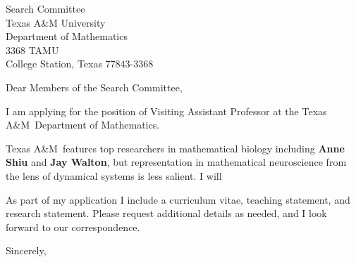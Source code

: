\documentclass[11pt,a4paper]{letter}
\begin{document}

\def\School{Texas A\&M}

\begin{letter}
{Search Committee\\
Texas A\&M University\\
Department of Mathematics\\
3368 TAMU\\
College Station, Texas 77843-3368}


\opening{Dear Members of the Search Committee,}

I am applying for the position of Visiting Assistant Professor at the \School~Department of Mathematics. 



\School~features top researchers in mathematical biology including \textbf{Anne Shiu} and \textbf{Jay Walton}, but representation in mathematical neuroscience from the lens of dynamical systems is less salient. I will 



As part of my application I include a curriculum vitae, teaching statement, and research statement. Please request additional details as needed, and I look forward to our correspondence.

\closing{Sincerely,}
\end{letter}
\end{document}
